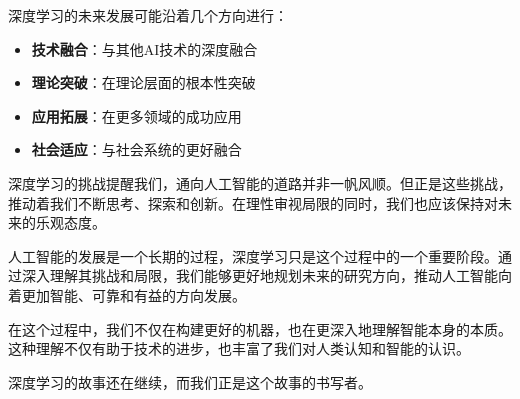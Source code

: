 深度学习的未来发展可能沿着几个方向进行：

\begin{itemize}
\item \textbf{技术融合}：与其他AI技术的深度融合
\item \textbf{理论突破}：在理论层面的根本性突破
\item \textbf{应用拓展}：在更多领域的成功应用
\item \textbf{社会适应}：与社会系统的更好融合
\end{itemize}

深度学习的挑战提醒我们，通向人工智能的道路并非一帆风顺。但正是这些挑战，推动着我们不断思考、探索和创新。在理性审视局限的同时，我们也应该保持对未来的乐观态度。

人工智能的发展是一个长期的过程，深度学习只是这个过程中的一个重要阶段。通过深入理解其挑战和局限，我们能够更好地规划未来的研究方向，推动人工智能向着更加智能、可靠和有益的方向发展。

在这个过程中，我们不仅在构建更好的机器，也在更深入地理解智能本身的本质。这种理解不仅有助于技术的进步，也丰富了我们对人类认知和智能的认识。

深度学习的故事还在继续，而我们正是这个故事的书写者。